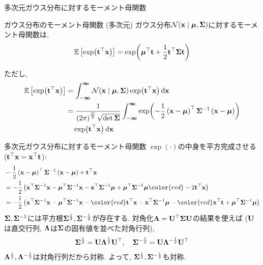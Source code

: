 \documentclass[dvipdfmx,notheorems,t]{beamer}
\begin{document}
\begin{frame}{多次元ガウス分布に対するモーメント母関数}
\begin{block}{ガウス分布のモーメント母関数 (多次元)}
  ガウス分布$\mathcal{N}(\vb{x} \mid \vb*{\mu}, \vb{\Sigma})$に対するモーメント母関数は,
  \begin{align*}
    \operatorname{\mathbb{E}} \left[ \exp(\vb{t}^\top \vb{x}) \right] = \exp(\vb*{\mu}^\top \vb{t}
      + \frac{1}{2} \vb{t}^\top \vb{\Sigma} \vb{t})
  \end{align*}
\end{block}

ただし,
\begin{align*}
  \operatorname{\mathbb{E}} \left[ \exp(\vb{t}^\top \vb{x}) \right] &= \int_{-\boldsymbol{\infty}}^{\boldsymbol{\infty}}
    \mathcal{N}(\vb{x} \mid \vb*{\mu}, \vb{\Sigma}) \exp(\vb{t}^\top \vb{x}) \dd{\vb{x}} \\
  &= \frac{1}{\left( 2\pi \right)^\frac{D}{2} \sqrt{\det \vb{\Sigma}}}
    \int_{-\boldsymbol{\infty}}^{\boldsymbol{\infty}}
    \exp(-\frac{1}{2} \left( \vb{x} - \vb*{\mu} \right)^\top \vb{\Sigma}^{-1}
      \left( \vb{x} - \vb*{\mu} \right)) \\
  & \quad \exp(\vb{t}^\top \vb{x}) \dd{\vb{x}}
\end{align*}
\end{frame}

\begin{frame}{多次元ガウス分布に対するモーメント母関数}
$\exp(\cdot)$の中身を平方完成させる ($\vb{t}^\top \vb{x} = \vb{x}^\top \vb{t}$):
\begin{align*}
  & -\frac{1}{2} \left( \vb{x} - \vb*{\mu} \right)^\top \vb{\Sigma}^{-1}
    \left( \vb{x} - \vb*{\mu} \right) + \vb{t}^\top \vb{x} \\
  &= -\frac{1}{2} \left( \vb{x}^\top \vb{\Sigma}^{-1} \vb{x}
    - \vb*{\mu}^\top \vb{\Sigma}^{-1} \vb{x}
    - \vb{x}^\top \vb{\Sigma}^{-1} \vb*{\mu}
    + \vb*{\mu}^\top \vb{\Sigma}^{-1} \vb*{\mu} {\color{red} - 2 \vb{t}^\top \vb{x}} \right) \\
  &= -\frac{1}{2} \left( \vb{x}^\top \vb{\Sigma}^{-1} \vb{x}
    - \vb*{\mu}^\top \vb{\Sigma}^{-1} \vb{x} - {\color{red} \vb{t}^\top \vb{x}}
    - \vb{x}^\top \vb{\Sigma}^{-1} \vb*{\mu} - {\color{red} \vb{x}^\top \vb{t}}
    + \vb*{\mu}^\top \vb{\Sigma}^{-1} \vb*{\mu} \right)
\end{align*}
$\vb{\Sigma}, \vb{\Sigma}^{-1}$には平方根$\vb{\Sigma}^{\frac{1}{2}}, \vb{\Sigma}^{-\frac{1}{2}}$が存在する.
対角化$\vb{\Lambda} = \vb{U}^\top \vb{\Sigma} \vb{U}$の結果を使えば
($\vb{U}$は直交行列, $\vb{\Lambda}$は$\vb{\Sigma}$の固有値を並べた対角行列),
\begin{gather*}
  \vb{\Sigma}^\frac{1}{2} = \vb{U} \vb{\Lambda}^\frac{1}{2} \vb{U}^\top, \quad
  \vb{\Sigma}^{-\frac{1}{2}} = \vb{U} \vb{\Lambda}^{-\frac{1}{2}} \vb{U}^\top
\end{gather*}
$\vb{\Lambda}^\frac{1}{2}, \vb{\Lambda}^{-\frac{1}{2}}$は対角行列だから対称.
よって, $\vb{\Sigma}^{\frac{1}{2}}, \vb{\Sigma}^{-\frac{1}{2}}$も対称.
\end{frame}
\end{document}
